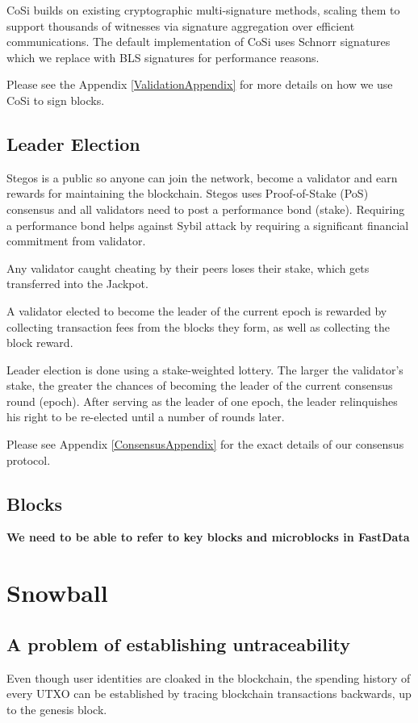 \documentclass[a4paper, 10pt, conference]{ieeeconf}
\newcommand{\comment}[1]{\par {\bfseries \color{blue} #1 \par}} %
\begin{document}
CoSi builds on existing cryptographic multi-signature methods, scaling them to support thousands of witnesses via signature aggregation over efficient communications. The default implementation of CoSi uses Schnorr signatures which we replace with BLS signatures for performance reasons.

Please see the Appendix \ref{ValidationAppendix} for more details on how we use CoSi to sign blocks.

\subsection{Leader Election}
Stegos is a public so anyone can join the network, become a validator and earn rewards for maintaining the blockchain. Stegos uses Proof-of-Stake (PoS) consensus and all validators need to post a performance bond (stake). Requiring a performance bond helps against Sybil attack by requiring a significant financial commitment from validator.

Any validator caught cheating by their peers loses their stake, which gets transferred into the Jackpot. 

A validator elected to become the leader of the current epoch is rewarded by collecting transaction fees from the blocks they form, as well as collecting the block reward. 

Leader election is done using a stake-weighted lottery. The larger the validator's stake, the greater the chances of becoming the leader of the current consensus round (epoch). After serving as the leader of one epoch, the leader relinquishes his right to be re-elected until a number of rounds later.

Please see Appendix \ref{ConsensusAppendix} for the exact details of our consensus protocol.

\subsection{Blocks}
\comment{We need to be able to refer to key blocks and microblocks in FastData}

\section{Snowball}\label{Snowball}

\subsection{A problem of establishing untraceability}
Even though user identities are cloaked in the blockchain, the spending history of every UTXO can be established by tracing blockchain transactions backwards, up to the genesis block.
\end{document}
